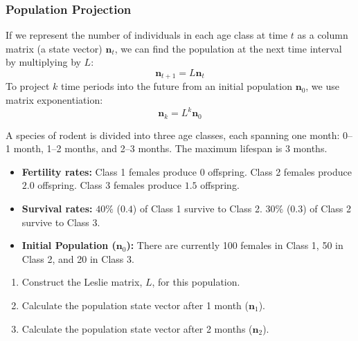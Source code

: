 \subsubsection*{Population Projection}

If we represent the number of individuals in each age class at time $t$ as a column matrix (a state vector) $\mathbf{n}_t$, we can find the population at the next time interval by multiplying by $L$:
\[
\mathbf{n}_{t+1} = L \mathbf{n}_t
\]
To project $k$ time periods into the future from an initial population $\mathbf{n}_0$, we use matrix exponentiation:
\[
\mathbf{n}_{k} = L^k \mathbf{n}_0
\]

\bigskip

\begin{problem}
A species of rodent is divided into three age classes, each spanning one month: 0--1 month, 1--2 months, and 2--3 months. The maximum lifespan is 3 months.
\begin{itemize}
  \item \textbf{Fertility rates:} Class 1 females produce $0$ offspring. Class 2 females produce $2.0$ offspring. Class 3 females produce $1.5$ offspring.
  \item \textbf{Survival rates:} $40\%$ ($0.4$) of Class 1 survive to Class 2. $30\%$ ($0.3$) of Class 2 survive to Class 3.
  \item \textbf{Initial Population ($\mathbf{n}_0$):} There are currently 100 females in Class 1, 50 in Class 2, and 20 in Class 3.
\end{itemize}

\begin{enumerate}[label=\textbf{(\alph*)}]
  \item Construct the Leslie matrix, $L$, for this population.
  \item Calculate the population state vector after 1 month ($\mathbf{n}_1$).
  \item Calculate the population state vector after 2 months ($\mathbf{n}_2$).
\end{enumerate}
\end{problem}

